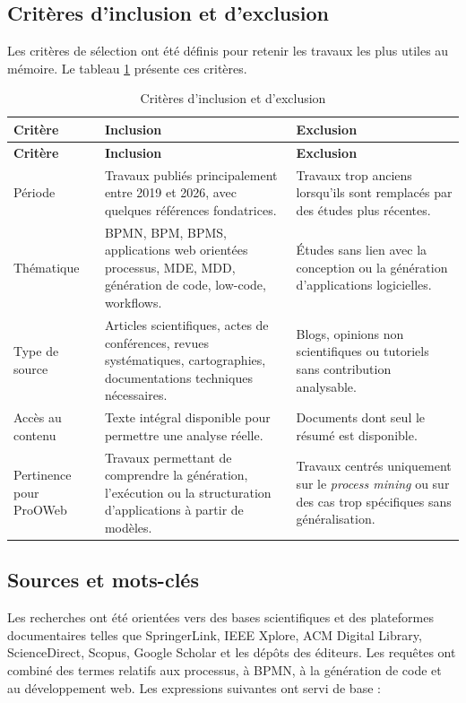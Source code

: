 \documentclass[12pt,a4paper]{article}
\begin{document}
\subsection{Critères d'inclusion et d'exclusion}

Les critères de sélection ont été définis pour retenir les travaux les plus utiles au mémoire. Le tableau \ref{tab:criteres} présente ces critères.

\begin{longtable}{|p{3.2cm}|p{5.7cm}|p{5.7cm}|}
\caption{Critères d'inclusion et d'exclusion}
\label{tab:criteres}\\
\hline
\textbf{Critère} & \textbf{Inclusion} & \textbf{Exclusion} \\
\hline
\endfirsthead
\hline
\textbf{Critère} & \textbf{Inclusion} & \textbf{Exclusion} \\
\hline
\endhead
Période & Travaux publiés principalement entre 2019 et 2026, avec quelques références fondatrices. & Travaux trop anciens lorsqu'ils sont remplacés par des études plus récentes. \\
\hline
Thématique & BPMN, BPM, BPMS, applications web orientées processus, MDE, MDD, génération de code, low-code, workflows. & Études sans lien avec la conception ou la génération d'applications logicielles. \\
\hline
Type de source & Articles scientifiques, actes de conférences, revues systématiques, cartographies, documentations techniques nécessaires. & Blogs, opinions non scientifiques ou tutoriels sans contribution analysable. \\
\hline
Accès au contenu & Texte intégral disponible pour permettre une analyse réelle. & Documents dont seul le résumé est disponible. \\
\hline
Pertinence pour ProOWeb & Travaux permettant de comprendre la génération, l'exécution ou la structuration d'applications à partir de modèles. & Travaux centrés uniquement sur le \textit{process mining} ou sur des cas trop spécifiques sans généralisation. \\
\hline
\end{longtable}

\subsection{Sources et mots-clés}

Les recherches ont été orientées vers des bases scientifiques et des plateformes documentaires telles que SpringerLink, IEEE Xplore, ACM Digital Library, ScienceDirect, Scopus, Google Scholar et les dépôts des éditeurs. Les requêtes ont combiné des termes relatifs aux processus, à BPMN, à la génération de code et au développement web. Les expressions suivantes ont servi de base :
\end{document}
